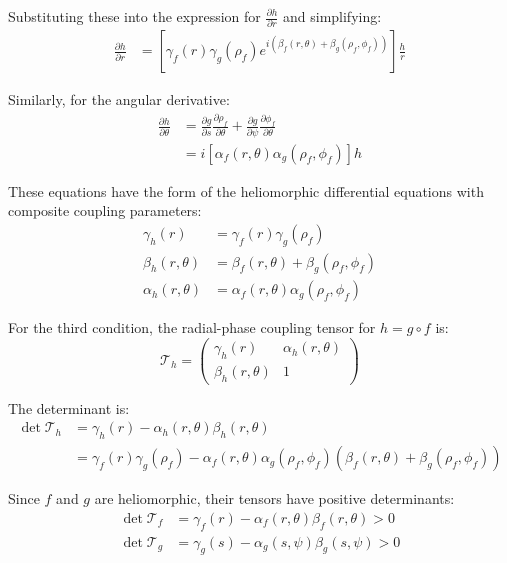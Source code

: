 \begin{definition}
\begin{enumerate}
\begin{definition}
Substituting these into the expression for $\frac{\partial h}{\partial r}$ and simplifying:
\begin{align}
\frac{\partial h}{\partial r} &= \left[\gamma_f(r)\gamma_g(\rho_f)e^{i(\beta_f(r,\theta) + \beta_g(\rho_f,\phi_f))}\right]\frac{h}{r}
\end{align}

Similarly, for the angular derivative:
\begin{align}
\frac{\partial h}{\partial \theta} &= \frac{\partial g}{\partial s}\frac{\partial \rho_f}{\partial \theta} + \frac{\partial g}{\partial \psi}\frac{\partial \phi_f}{\partial \theta}\\
&= i\left[\alpha_f(r,\theta)\alpha_g(\rho_f,\phi_f)\right]h
\end{align}

These equations have the form of the heliomorphic differential equations with composite coupling parameters:
\begin{align}
\gamma_h(r) &= \gamma_f(r)\gamma_g(\rho_f)\\
\beta_h(r,\theta) &= \beta_f(r,\theta) + \beta_g(\rho_f,\phi_f)\\
\alpha_h(r,\theta) &= \alpha_f(r,\theta)\alpha_g(\rho_f,\phi_f)
\end{align}

For the third condition, the radial-phase coupling tensor for $h = g \circ f$ is:
\begin{equation}
\mathcal{T}_h = \begin{pmatrix}
\gamma_h(r) & \alpha_h(r,\theta)\\
\beta_h(r,\theta) & 1
\end{pmatrix}
\end{equation}

The determinant is:
\begin{align}
\det\mathcal{T}_h &= \gamma_h(r) - \alpha_h(r,\theta)\beta_h(r,\theta)\\
&= \gamma_f(r)\gamma_g(\rho_f) - \alpha_f(r,\theta)\alpha_g(\rho_f,\phi_f)(\beta_f(r,\theta) + \beta_g(\rho_f,\phi_f))
\end{align}

Since $f$ and $g$ are heliomorphic, their tensors have positive determinants:
\begin{align}
\det\mathcal{T}_f &= \gamma_f(r) - \alpha_f(r,\theta)\beta_f(r,\theta) > 0\\
\det\mathcal{T}_g &= \gamma_g(s) - \alpha_g(s,\psi)\beta_g(s,\psi) > 0
\end{align}


\end{definition}
\end{enumerate}
\end{definition}
